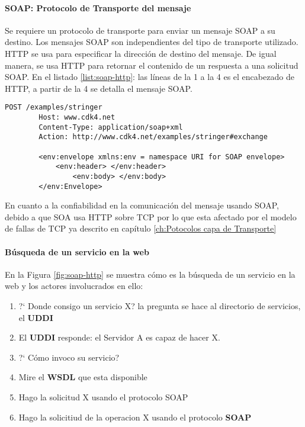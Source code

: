  
 
   	\paragraph{SOAP: Protocolo de Transporte del mensaje} 
   	Se requiere un protocolo de transporte para enviar un mensaje SOAP
   	 a su destino. Los mensajes SOAP son independientes del tipo de transporte utilizado. HTTP  se usa para especificar la dirección de destino del mensaje. De igual manera,   se usa  HTTP  para retornar el contenido de un respuesta a una solicitud SOAP. En el listado \ref{list:soap-http}: las l\'ineas de la 1 a la 4 es el encabezado de HTTP, a partir de la 4 se detalla el mensaje SOAP. 
 \cite{Coulouris2011}
 
 
 	\begin{lstlisting}[label=list:soap-http, caption=Protocolo de Transporte en SOAP. Tomado de  \cite{Coulouris2011}]
 		POST /examples/stringer
 		Host: www.cdk4.net
 		Content-Type: application/soap+xml
 		Action: http://www.cdk4.net/examples/stringer#exchange
 		
 		<env:envelope xmlns:env = namespace URI for SOAP envelope>
 			<env:header> </env:header>
 				<env:body> </env:body>
 		</env:Envelope>
 	\end{lstlisting}
 	
 	
 En cuanto a la confiabilidad en la comunicaci\'on del mensaje usando SOAP, debido a que SOA  usa  HTTP sobre TCP por lo que esta afectado por el modelo de fallas de TCP ya descrito en cap\'itulo \ref{ch:Potocolos capa de Transporte}	
 
 \paragraph{B\'usqueda de un servicio en la web}
 
 En la Figura \ref{fig:soap-http} se muestra c\'omo es la b\'usqueda de un servicio en la web y los actores involucrados en ello:
 
 \begin{enumerate}
 	\item ?` Donde consigo un servicio X? la pregunta se hace al directorio de servicios, el \textbf{UDDI}    
 	\item El \textbf{UDDI} responde: el Servidor A es capaz de hacer X. 
 	\item ?` C\'omo invoco su servicio?                       
 	\item Mire el \textbf{WSDL}  que esta disponible    
 	\item Hago la solicitud X usando el protocolo SOAP                  
 	\item Hago la solicitiud de la  operacion X usando el protocolo \textbf{SOAP}
 \end{enumerate}
   
